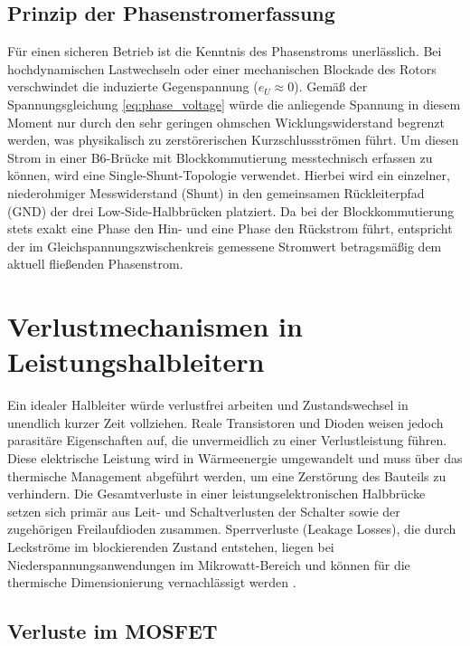 \subsection{Prinzip der Phasenstromerfassung}
\label{subsec:stromerfassung}
Für einen sicheren Betrieb ist die Kenntnis des Phasenstroms unerlässlich. Bei hochdynamischen Lastwechseln oder einer mechanischen Blockade des Rotors verschwindet die induzierte Gegenspannung ($e_U \approx 0$). Gemäß der Spannungsgleichung \ref{eq:phase_voltage} würde die anliegende Spannung in diesem Moment nur durch den sehr geringen ohmschen Wicklungswiderstand begrenzt werden, was physikalisch zu zerstörerischen Kurzschlussströmen führt. 
Um diesen Strom in einer B6-Brücke mit Blockkommutierung messtechnisch erfassen zu können, wird eine Single-Shunt-Topologie verwendet. Hierbei wird ein einzelner, niederohmiger Messwiderstand (Shunt) in den gemeinsamen Rückleiterpfad (GND) der drei Low-Side-Halbbrücken platziert. Da bei der Blockkommutierung stets exakt eine Phase den Hin- und eine Phase den Rückstrom führt, entspricht der im Gleichspannungszwischenkreis gemessene Stromwert betragsmäßig dem aktuell fließenden Phasenstrom.

\section{Verlustmechanismen in Leistungshalbleitern}
\label{sec:verluste}

Ein idealer Halbleiter würde verlustfrei arbeiten und Zustandswechsel in unendlich kurzer Zeit vollziehen. Reale Transistoren und Dioden weisen jedoch parasitäre Eigenschaften auf, die unvermeidlich zu einer Verlustleistung führen. Diese elektrische Leistung wird in Wärmeenergie umgewandelt und muss über das thermische Management abgeführt werden, um eine Zerstörung des Bauteils zu verhindern. 
Die Gesamtverluste in einer leistungselektronischen Halbbrücke setzen sich primär aus Leit- und Schaltverlusten der Schalter sowie der zugehörigen Freilaufdioden zusammen. Sperrverluste (Leakage Losses), die durch Leckströme im blockierenden Zustand entstehen, liegen bei Niederspannungsanwendungen im Mikrowatt-Bereich und können für die thermische Dimensionierung vernachlässigt werden \cite[S.~3]{Infineon_MOSFET_Losses}.

\subsection{Verluste im MOSFET}
\label{subsec:mosfet_verluste}

